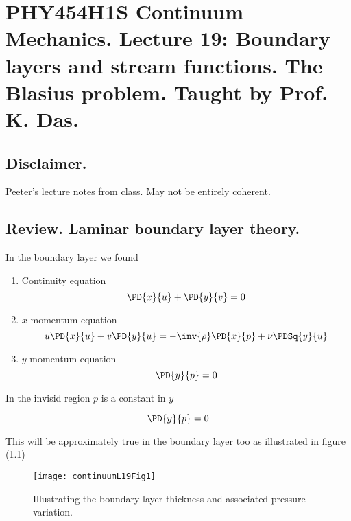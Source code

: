 
%

\chapter{PHY454H1S Continuum Mechanics.  Lecture 19: Boundary layers and stream functions.  The Blasius problem.  Taught by Prof. K. Das.}
\label{chap:continuumL19}
{}
\date{Mar 23, 2012}

\beginArtWithToc

\section{Disclaimer.}

Peeter's lecture notes from class.  May not be entirely coherent.

\section{Review.  Laminar boundary layer theory.}

In the boundary layer we found
\begin{enumerate}
\item Continuity equation
\begin{equation}\label{eqn:continuumL19:n}
\PD{x}{u} + \PD{y}{v} = 0
\end{equation}
\item $x$ momentum equation
\begin{equation}\label{eqn:continuumL19:n}
u \PD{x}{u} + v \PD{y}{u} = - \inv{\rho} \PD{x}{p} + \nu \PDSq{y}{u}
\end{equation}
\item $y$ momentum equation
\begin{equation}\label{eqn:continuumL19:n}
\PD{y}{p} = 0
\end{equation}
\end{enumerate}

In the invisid region $p$ is a constant in $y$

\begin{equation}\label{eqn:continuumL19:n}
\PD{y}{p} = 0
\end{equation}

This will be approximately true in the boundary layer too as illustrated in figure (\ref{fig:continuumL19:continuumL19Fig1})
\begin{figure}[htp]
   \centering
   \texttt{[image: continuumL19Fig1]}
   \caption{Illustrating the boundary layer thickness and associated pressure variation.}\label{fig:continuumL19:continuumL19Fig1}
\end{figure}

